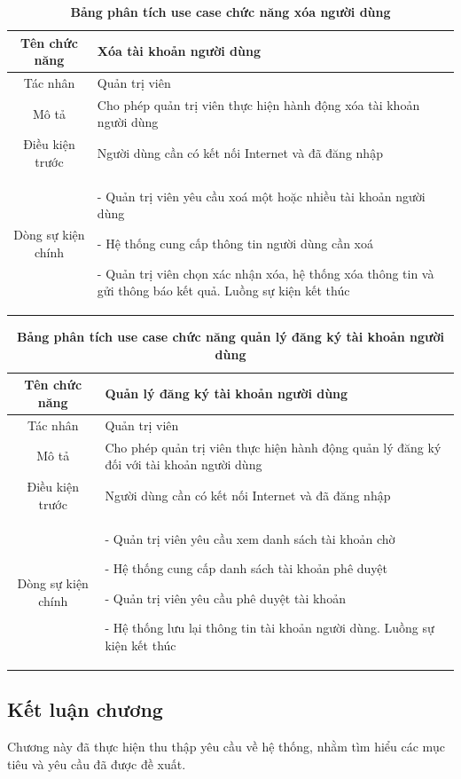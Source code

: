   \begin{table}[H]
    \caption{\bfseries \fontsize{12pt}{0pt}\selectfont Bảng phân tích use case chức năng xóa người dùng}
    \centering
    \begin{tabularx}{0.9\textwidth}{|c|X|}
      \hline
      \textbf{Tên chức năng} & \textbf{Xóa tài khoản người dùng} \\
      \hline
      Tác nhân & Quản trị viên \\
      \hline
      Mô tả & Cho phép quản trị viên thực hiện hành động xóa tài khoản người dùng \\
      \hline
      Điều kiện trước & Người dùng cần có kết nối Internet và đã đăng nhập \\
      \hline
      Dòng sự kiện chính & 
        - Quản trị viên yêu cầu xoá một hoặc nhiều tài khoản người dùng

        - Hệ thống cung cấp thông tin người dùng cần xoá

        - Quản trị viên chọn xác nhận xóa, hệ thống xóa thông tin và gửi thông báo kết quả. Luồng sự kiện kết thúc
        \\
      \hline
    \end{tabularx}
  \end{table}

  \begin{table}[H]
    \caption{\bfseries \fontsize{12pt}{0pt}\selectfont Bảng phân tích use case chức năng quản lý đăng ký tài khoản người dùng}
    \centering
    \begin{tabularx}{0.9\textwidth}{|c|X|}
      \hline
      \textbf{Tên chức năng} & \textbf{Quản lý đăng ký tài khoản người dùng} \\
      \hline
      Tác nhân & Quản trị viên \\
      \hline
      Mô tả & Cho phép quản trị viên thực hiện hành động quản lý đăng ký đối với tài khoản người dùng \\
      \hline
      Điều kiện trước & Người dùng cần có kết nối Internet và đã đăng nhập \\
      \hline
      Dòng sự kiện chính & 
        - Quản trị viên yêu cầu xem danh sách tài khoản chờ

        - Hệ thống cung cấp danh sách tài khoản phê duyệt

        - Quản trị viên yêu cầu phê duyệt tài khoản

        - Hệ thống lưu lại thông tin tài khoản người dùng. Luồng sự kiện kết thúc        
        \\
      \hline
    \end{tabularx}
  \end{table}

\subsection{Kết luận chương}

Chương này đã thực hiện thu thập yêu cầu về
 hệ thống, nhằm tìm hiểu các mục tiêu và yêu cầu đã được đề xuất.

\newpage
